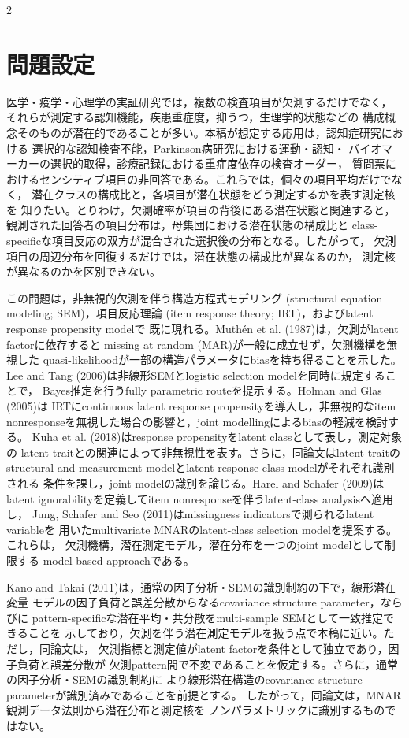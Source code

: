 \documentclass[a4paper,10pt]{article}
\begin{document}
\begin{multicols}{2}

\section{問題設定}
医学・疫学・心理学の実証研究では，複数の検査項目が欠測するだけでなく，
それらが測定する認知機能，疾患重症度，抑うつ，生理学的状態などの
構成概念そのものが潜在的であることが多い。本稿が想定する応用は，認知症研究における
選択的な認知検査不能，Parkinson病研究における運動・認知・
バイオマーカーの選択的取得，診療記録における重症度依存の検査オーダー，
質問票におけるセンシティブ項目の非回答である。これらでは，個々の項目平均だけでなく，
潜在クラスの構成比と，各項目が潜在状態をどう測定するかを表す測定核を
知りたい。とりわけ，欠測確率が項目の背後にある潜在状態と関連すると，
観測された回答者の項目分布は，母集団における潜在状態の構成比と
class-specificな項目反応の双方が混合された選択後の分布となる。したがって，
欠測項目の周辺分布を回復するだけでは，潜在状態の構成比が異なるのか，
測定核が異なるのかを区別できない。

この問題は，非無視的欠測を伴う構造方程式モデリング
(structural equation modeling; SEM)，項目反応理論
(item response theory; IRT)，およびlatent response propensity modelで
既に現れる。Muth\'en et al. (1987)は，欠測がlatent factorに依存すると
missing at random (MAR)が一般に成立せず，欠測機構を無視した
quasi-likelihoodが一部の構造パラメータにbiasを持ち得ることを示した。
Lee and Tang (2006)は非線形SEMとlogistic selection modelを同時に規定することで，
Bayes推定を行うfully parametric routeを提示する。Holman and Glas (2005)は
IRTにcontinuous latent response propensityを導入し，非無視的なitem
nonresponseを無視した場合の影響と，joint modellingによるbiasの軽減を検討する。
Kuha et al. (2018)はresponse propensityをlatent classとして表し，測定対象の
latent traitとの関連によって非無視性を表す。さらに，同論文はlatent traitの
structural and measurement modelとlatent response class modelがそれぞれ識別される
条件を課し，joint modelの識別を論じる。Harel and Schafer (2009)はlatent
ignorabilityを定義してitem nonresponseを伴うlatent-class analysisへ適用し，
Jung, Schafer and Seo (2011)はmissingness indicatorsで測られるlatent variableを
用いたmultivariate MNARのlatent-class selection modelを提案する。これらは，
欠測機構，潜在測定モデル，潜在分布を一つのjoint modelとして制限する
model-based approachである。

Kano and Takai (2011)は，通常の因子分析・SEMの識別制約の下で，線形潜在変量
モデルの因子負荷と誤差分散からなるcovariance structure parameter，ならびに
pattern-specificな潜在平均・共分散をmulti-sample SEMとして一致推定できることを
示しており，欠測を伴う潜在測定モデルを扱う点で本稿に近い。ただし，同論文は，
欠測指標と測定値がlatent factorを条件として独立であり，因子負荷と誤差分散が
欠測pattern間で不変であることを仮定する。さらに，通常の因子分析・SEMの識別制約に
より線形潜在構造のcovariance structure parameterが識別済みであることを前提とする。
したがって，同論文は，MNAR観測データ法則から潜在分布と測定核を
ノンパラメトリックに識別するものではない。


\end{multicols}
\end{document}

